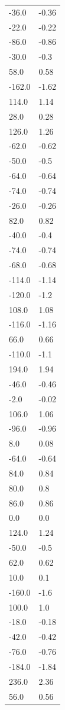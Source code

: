\begin{longtable}{ll}
-36.0 & -0.36 \\
-22.0 & -0.22 \\
-86.0 & -0.86 \\
-30.0 & -0.3 \\
58.0 & 0.58 \\
-162.0 & -1.62 \\
114.0 & 1.14 \\
28.0 & 0.28 \\
126.0 & 1.26 \\
-62.0 & -0.62 \\
-50.0 & -0.5 \\
-64.0 & -0.64 \\
-74.0 & -0.74 \\
-26.0 & -0.26 \\
82.0 & 0.82 \\
-40.0 & -0.4 \\
-74.0 & -0.74 \\
-68.0 & -0.68 \\
-114.0 & -1.14 \\
-120.0 & -1.2 \\
108.0 & 1.08 \\
-116.0 & -1.16 \\
66.0 & 0.66 \\
-110.0 & -1.1 \\
194.0 & 1.94 \\
-46.0 & -0.46 \\
-2.0 & -0.02 \\
106.0 & 1.06 \\
-96.0 & -0.96 \\
8.0 & 0.08 \\
-64.0 & -0.64 \\
84.0 & 0.84 \\
80.0 & 0.8 \\
86.0 & 0.86 \\
0.0 & 0.0 \\
124.0 & 1.24 \\
-50.0 & -0.5 \\
62.0 & 0.62 \\
10.0 & 0.1 \\
-160.0 & -1.6 \\
100.0 & 1.0 \\
-18.0 & -0.18 \\
-42.0 & -0.42 \\
-76.0 & -0.76 \\
-184.0 & -1.84 \\
236.0 & 2.36 \\
56.0 & 0.56 \\

\end{longtable}
